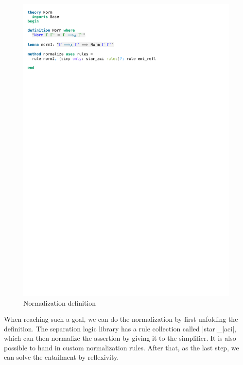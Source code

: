 \begin{figure}[htpb]
    \includegraphics[trim={0 26,2cm 0 2,4cm}, clip, width=1.00\textwidth]{figures/Theory_Norm.pdf}
    \caption[Normalization definition]{Normalization definition}
    \label{fig:norm}
\end{figure}

\noindent When reaching such a goal, we can do the normalization by first unfolding the definition. The separation logic library has a rule collection called |star|\_|aci|, which can then normalize the assertion by giving it to the simplifier. It is also possible to hand in custom normalization rules. After that, as the last step, we can solve the entailment by reflexivity. 

